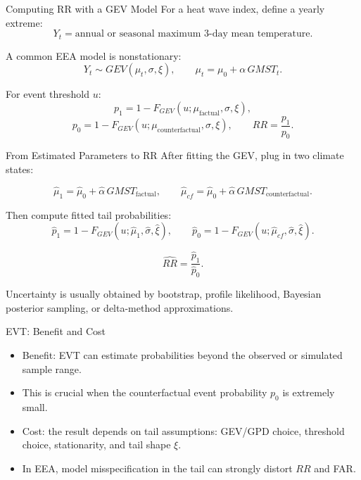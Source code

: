 \documentclass[aspectratio=169]{beamer}
\begin{document}
\begin{frame}{Computing RR with a GEV Model}
  For a heat wave index, define a yearly extreme:
  \[
    Y_t = \text{annual or seasonal maximum 3-day mean temperature}.
  \]

  A common EEA model is nonstationary:
  \[
    Y_t \sim GEV(\mu_t,\sigma,\xi),
    \qquad
    \mu_t=\mu_0+\alpha \, GMST_t.
  \]

  For event threshold $u$:
  \[
    p_1 = 1-F_{GEV}(u;\mu_{\text{factual}},\sigma,\xi),
  \]
  \[
    p_0 = 1-F_{GEV}(u;\mu_{\text{counterfactual}},\sigma,\xi),
    \qquad
    RR=\frac{p_1}{p_0}.
  \]
\end{frame}

\begin{frame}{From Estimated Parameters to RR}
  \small
  After fitting the GEV, plug in two climate states:

  \[
    \hat\mu_1=\hat\mu_0+\hat\alpha\,GMST_{\text{factual}},
    \qquad
    \hat\mu_{cf}=\hat\mu_0+\hat\alpha\,GMST_{\text{counterfactual}}.
  \]

  Then compute fitted tail probabilities:
  \[
    \hat p_1
    =
    1-F_{GEV}(u;\hat\mu_1,\hat\sigma,\hat\xi),
    \qquad
    \hat p_0
    =
    1-F_{GEV}(u;\hat\mu_{cf},\hat\sigma,\hat\xi).
  \]

  \[
    \widehat{RR}=\frac{\hat p_1}{\hat p_0}.
  \]

  Uncertainty is usually obtained by bootstrap, profile likelihood, Bayesian posterior sampling, or delta-method approximations.
\end{frame}

\begin{frame}{EVT: Benefit and Cost}
  \begin{itemize}
    \item Benefit: EVT can estimate probabilities beyond the observed or simulated sample range.
    \item This is crucial when the counterfactual event probability $p_0$ is extremely small.
    \item Cost: the result depends on tail assumptions: GEV/GPD choice, threshold choice, stationarity, and tail shape $\xi$.
    \item In EEA, model misspecification in the tail can strongly distort $RR$ and FAR.
  \end{itemize}
\end{frame}
\end{document}
